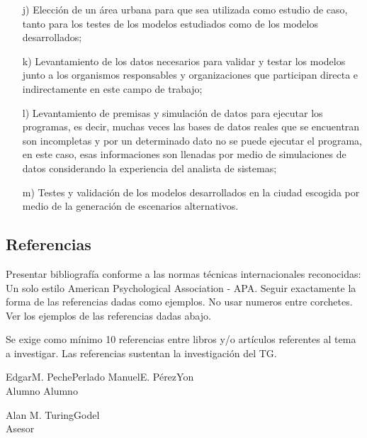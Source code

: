 \documentclass[a4paper, 12pt]{article}
\begin{document}
\begin{enumerate}
\item[j)]	Elección de un área urbana para que sea utilizada como estudio de caso,  tanto para los testes de los modelos estudiados como de los modelos desarrollados;
\item[k)]	Levantamiento de los datos necesarios para validar y testar los modelos junto a los organismos responsables y organizaciones que participan directa e indirectamente en este campo de trabajo;
\item[l)]	Levantamiento de premisas y simulación de datos para ejecutar los programas, es decir, muchas veces las bases de datos reales que se encuentran son incompletas y por un determinado dato no se puede ejecutar el programa, en este caso, esas informaciones son llenadas por medio de simulaciones de datos considerando la experiencia del analista de sistemas;
\item[m)]	Testes y validación de los modelos desarrollados en la ciudad escogida por medio de la generación de escenarios alternativos.    
\end{enumerate}
    



\subsection{Referencias}
Presentar bibliografía conforme a las normas técnicas internacionales reconocidas: Un solo estilo American Psychological Association - APA. Seguir exactamente la forma de las referencias dadas como ejemplos. No usar numeros entre corchetes. Ver los ejemplos de las referencias dadas abajo.\par
\vskip 0.3cm
Se exige como mínimo 10 referencias entre libros y/o artículos referentes al tema a investigar. Las referencias sustentan la investigación del TG.



\vskip 1cm

\hspace{0.7cm}Edgar\hspace{.1cm}M.\hspace{.1cm} Peche\hspace{.1cm}Perlado 
\hspace{4cm}Manuel\hspace{.1cm}E.\hspace{.1cm} Pérez\hspace{.1cm}Yon \\
\hspace*{2.6cm} Alumno  \hspace*{6.6cm}Alumno


\vskip 1cm
\begin{center}
Alan \hspace{.1cm}M.\hspace{.1cm} Turing\hspace{.1cm}Godel\\
 Asesor
\end{center}
\end{document}
